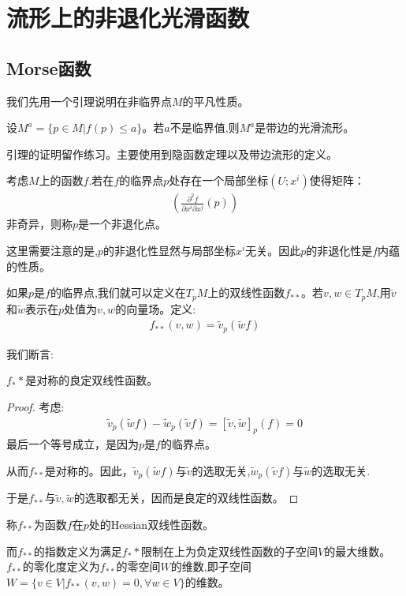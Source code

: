 \ifx\allfiles\undefined

	
	
\else
\fi
\chapter{流形上的非退化光滑函数}
\section{Morse函数}
我们先用一个引理说明在非临界点$M$的平凡性质。
\begin{lemma}[非临界点]
	设$M^a=\{p\in M|f(p)\leq a\}$。若$a$不是临界值,则$M^a$是带边的光滑流形。
\end{lemma}

引理的证明留作练习。主要使用到隐函数定理以及带边流形的定义。

\begin{definition}[非退化点]
	考虑$M$上的函数$f$.若在$f$的临界点$p$处存在一个局部坐标$(U;x^i)$使得矩阵：
	\begin{align}\label{Hess}
		(\frac{\partial^2 f}{\partial x^i\partial x^j}(p))
	\end{align}
	非奇异，则称$p$是一个非退化点。
\end{definition}
这里需要注意的是,$p$的非退化性显然与局部坐标$x^i$无关。因此$p$的非退化性是$f$内蕴的性质。

如果$p$是$f$的临界点,我们就可以定义在$T_pM$上的双线性函数$f_{**}$。若$v,w \in T_pM$,用$\tilde{v}$和$\tilde{w}$表示在$p$处值为$v,w$的向量场。定义:
\begin{align}
	f_{**}(v,w)=\tilde{v}_p(\tilde{w}f)
\end{align}

我们断言:
\begin{lemma}
	$f_**$是对称的良定双线性函数。
\end{lemma}
\begin{proof}
	考虑:
	\begin{align}
		\tilde{v}_p(\tilde{w}f)-\tilde{w}_p(\tilde{v}f)=[\tilde{v},\tilde{w}]_p(f)=0
	\end{align}
	最后一个等号成立，是因为$p$是$f$的临界点。

	从而$f_{**}$是对称的。因此，$\tilde{v}_p(\tilde{w}f)$与$\tilde{v}$的选取无关,$\tilde{w}_p(\tilde{v}f)$与$\tilde{w}$的选取无关.

	于是$f_{**}$与$\tilde{v},\tilde{w}$的选取都无关，因而是良定的双线性函数。
\end{proof}
\begin{definition}
    \quad \quad 称$f_{**}$为函数$f$在$p$处的Hessian双线性函数。
	
	而$f_{**}$的指数定义为满足$f_**$限制在上为负定双线性函数的子空间$V$的最大维数。$f_{**}$的零化度定义为$f_{**}$的零空间$W$的维数,即子空间$W=\{v \in V|f_{**}(v,w)=0,\forall w\in V\}$的维数。
\end{definition}

